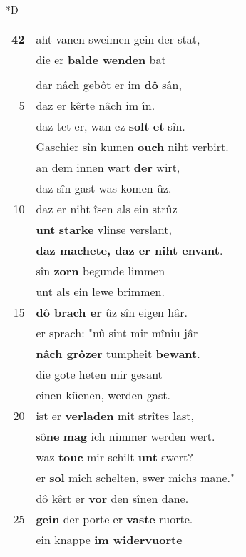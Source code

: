 \documentclass[8pt,a4paper,notitlepage]{article}
\begin{document}
\begin{table}[ht]
\begin{minipage}[t]{0.5\linewidth}
\small
\begin{center}*D
\end{center}
\begin{tabular}{rl}
\textbf{42} & aht vanen sweimen gein der stat,\\ 
 & die er \textbf{balde wenden} bat\\ 
 & \textit{\begin{large}D\end{large}}en küenen, sig\textit{e}lôsen man.\\ 
 & dar nâch gebôt er im \textbf{dô} sân,\\ 
5 & daz er kêrte nâch im în.\\ 
 & daz tet er, wan ez \textbf{solt} \textbf{et} sîn.\\ 
 & Gaschier sîn kumen \textbf{ouch} niht verbirt.\\ 
 & an dem innen wart \textbf{der} wirt,\\ 
 & daz sîn gast was komen ûz.\\ 
10 & daz er niht îsen als ein strûz\\ 
 & \textbf{unt} \textbf{starke} vlinse verslant,\\ 
 & \textbf{daz machete, daz er niht envant}.\\ 
 & sîn \textbf{zorn} begunde limmen\\ 
 & unt als ein lewe brimmen.\\ 
15 & \textbf{dô brach er} ûz sîn eigen hâr.\\ 
 & er sprach: "nû sint mir mîniu jâr\\ 
 & \textbf{nâch grôzer} tumpheit \textbf{bewant}.\\ 
 & die gote heten mir gesant\\ 
 & einen küenen, werden gast.\\ 
20 & ist er \textbf{verladen} mit strîtes last,\\ 
 & sô\textbf{ne} \textbf{mag} ich nimmer werden wert.\\ 
 & waz \textbf{touc} mir schilt \textbf{unt} swert?\\ 
 & er \textbf{sol} mich schelten, swer michs mane."\\ 
 & dô kêrt er \textbf{vor} den sînen dane.\\ 
25 & \textbf{gein} der porte er \textbf{vaste} ruorte.\\ 
 & ein knappe \textbf{im widervuorte}\\ 

\end{tabular}
\end{minipage}
\end{table}
\end{document}
